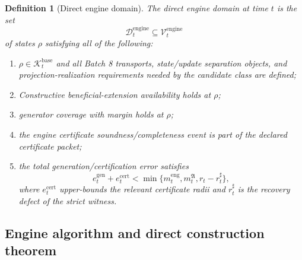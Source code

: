 \documentclass[11pt]{article}
\newtheorem{definition}[theorem]{Definition}
\newcommand{\1}{\mathbf{1}}
\providecommand{\Dcal}{\mathcal{D}}
\providecommand{\Kcal}{\mathcal{K}}
\providecommand{\Vcal}{\mathcal{V}}
\begin{document}
\begin{definition}[Direct engine domain]
\label{def:direct_engine_domain}
The direct engine domain at time \(t\) is the set
\[
\Dcal_t^{\mathrm{engine}}
\subseteq
\Vcal_t^{\mathrm{engine}}
\]
of states \(\rho\) satisfying all of the following:
\begin{enumerate}[label=(\roman*),leftmargin=1.5em]
    \item \(\rho\in\Kcal_t^{\mathrm{base}}\) and all Batch 8 transports, state/update separation objects, and projection-realization requirements needed by the candidate class are defined;
    \item Constructive beneficial-extension availability holds at \(\rho\);
    \item generator coverage with margin holds at \(\rho\);
    \item the engine certificate soundness/completeness event is part of the declared certificate packet;
    \item the total generation/certification error satisfies
    \[
    e_t^{\mathrm{gen}}+e_t^{\mathrm{cert}}
    <
    \min\{m_t^{\mathrm{eng}},m_t^{\mathfrak A},r_t-r_t^{\sharp}\},
    \]
    where \(e_t^{\mathrm{cert}}\) upper-bounds the relevant certificate radii and \(r_t^{\sharp}\) is the recovery defect of the strict witness.
\end{enumerate}
\end{definition}

\subsection{Engine algorithm and direct construction theorem}
\end{document}
